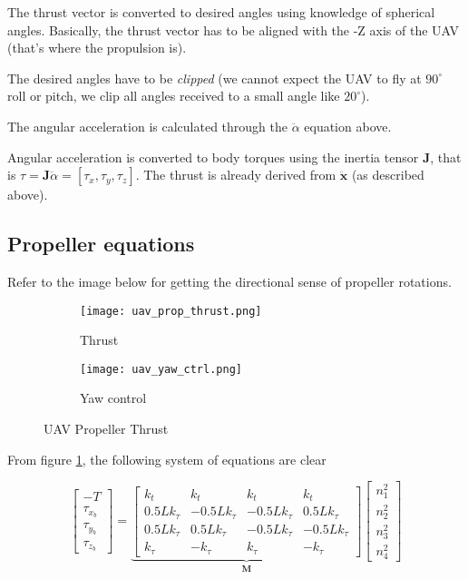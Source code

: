 The thrust vector is converted to desired angles using knowledge of spherical angles. Basically, the thrust vector has to be aligned with the -Z axis of the UAV (that's where the propulsion is). 

The desired angles have to be \emph{clipped} (we cannot expect the UAV to fly at $90^\circ$ roll or pitch, we clip all angles received to a small angle like $20^\circ$).

The angular acceleration is calculated through the $\ddot{\alpha}$ equation above.

Angular acceleration is converted to body torques using the inertia tensor $\mathbf{J}$, that is $\tau = \mathbf{J} \ddot{\alpha} = [\tau_x, \tau_y, \tau_z]$. The thrust is already derived from $\ddot{\mathbf{x}}$ (as described above).

\subsection{Propeller equations}

Refer to the image below for getting the directional sense of propeller rotations.

\begin{figure}[ht]
    \centering
    \begin{subfigure}[b]{0.3\textwidth}
        \centering
        \texttt{[image: uav\_prop\_thrust.png]}
        \caption{Thrust}
    \end{subfigure}
    \begin{subfigure}[b]{0.6\textwidth}
        \centering
        \texttt{[image: uav\_yaw\_ctrl.png]}
        \caption{Yaw control}
    \end{subfigure}
    \caption{UAV Propeller Thrust}
    \label{fig:uav-prop-thrust}
\end{figure}

From figure \ref{fig:uav-prop-thrust}, the following system of equations are clear

\begin{equation}
    \begin{bmatrix}
    -T \\ \tau_{x_b} \\ \tau_{y_b} \\ \tau_{z_b}
    \end{bmatrix} = \underset{\mathbf{M}}{\underbrace{\begin{bmatrix}
    k_t & k_t & k_t & k_t \\
    0.5 L k_{\tau} & -0.5 L k_{\tau} & -0.5 L k_{\tau} & 0.5 L k_{\tau} \\
    0.5 L k_{\tau} & 0.5 L k_{\tau} & -0.5 L k_{\tau} & -0.5 L k_{\tau} \\
    k_{\tau} & -k_{\tau} & k_{\tau} & -k_{\tau}
    \end{bmatrix}}}
    \begin{bmatrix}
    n_1^2 \\ n_2^2 \\ n_3^2 \\ n_4^2
    \end{bmatrix}
    \label{eq:prop-thrust-fm-sp}
\end{equation}

